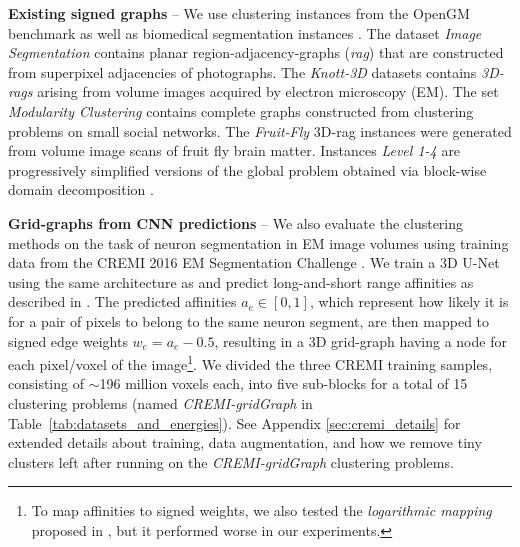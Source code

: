 \textbf{Existing signed graphs}  -- We use clustering instances from the OpenGM benchmark \cite{kappes2013comparative} as well as biomedical segmentation instances \cite{pape2017solving}. The dataset \emph{Image Segmentation} contains planar region-adjacency-graphs (\emph{rag}) that are constructed from superpixel adjacencies of photographs. The \emph{Knott-3D} datasets contains \emph{3D-rags} arising from volume images acquired by electron microscopy (EM). The set \emph{Modularity Clustering} contains complete graphs constructed from clustering problems on small social networks. The \emph{Fruit-Fly} 3D-rag instances were generated from volume image scans of fruit fly brain matter. Instances \emph{Level 1-4} are progressively simplified versions of the global problem obtained via block-wise domain decomposition \cite{pape2017solving}.

\textbf{Grid-graphs from CNN predictions} -- We also evaluate the clustering methods on the task of neuron segmentation in EM image volumes using training data from the CREMI 2016 EM Segmentation Challenge \cite{cremiChallenge}.
We train a 3D U-Net \cite{ronneberger2015u,cciccek20163d} using the same architecture as \cite{funke2018large} and predict long-and-short range affinities 
as described in \cite{lee2017superhuman}. The predicted affinities $a_e\in[0,1]$, which represent how likely it is for a pair of pixels to belong to the same neuron segment, are then mapped to signed edge weights $w_e=a_e-0.5$, resulting in a 3D grid-graph having a node for each pixel/voxel of the  image\footnote{To map affinities to signed weights, we also tested the \emph{logarithmic mapping} proposed in \cite{finkel2008enforcing,andres2012globally}, but it performed worse in our experiments.}. 
We divided the three CREMI training samples, consisting of $\sim$196 million voxels each, into five sub-blocks for a total of 15 clustering problems (named \emph{CREMI-gridGraph} in Table~\ref{tab:datasets_and_energies}). See Appendix \ref{sec:cremi_details} for extended details about training, data augmentation, and how we remove tiny clusters left after running \algname{} on the \emph{CREMI-gridGraph} clustering problems.

